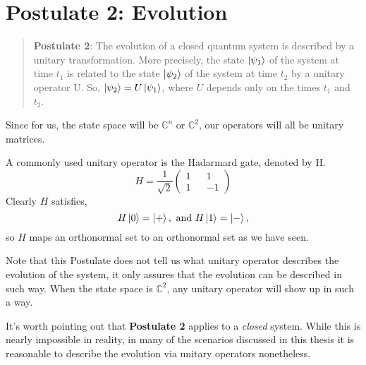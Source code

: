 \section{Postulate 2: Evolution}

\begin{quote}
    \textbf{Postulate 2}: The evolution of a closed quantum system is described by a unitary transformation. More precisely, the state $\ket{\psi_1}$ of the system at time $t_1$ is related to the state $\ket{\psi_2}$ of the system at time $t_2$ by a unitary operator U.  So, $\ket{\psi_2}=U\ket{\psi_1}$, where $U$ depends only on the times $t_1$ and $t_2$.
\end{quote}

Since for us, the state space will be ${\mathbb{C}}^n$ or ${\mathbb{C}}^2$, our operators will all be unitary matrices.  

\begin{example} 
A commonly used unitary operator is the Hadarmard gate, denoted by H.  
\begin{equation}
   H=\frac{1}{\sqrt{2}}\begin{pmatrix}
1 && 1\\
1 && -1
\end{pmatrix} 
\end{equation}
Clearly $H$ satisfies,
$$H\ket{0}=\ket{+}, \textrm{ and }H\ket{1}=\ket{-},$$
so $H$ maps an orthonormal set to an orthonormal set as we have seen.

\end{example}


Note that this Postulate does not tell us what unitary operator describes the evolution of the system, it only assures that the evolution can be described in such way.  When the state space is ${\mathbb{C}}^2$, any unitary operator will show up in such a way.

It's worth pointing out that {\bf{Postulate 2}} applies to a \emph{closed} system.  While this is nearly impossible in reality, in many of the scenarios discussed in this thesis it is reasonable to describe the evolution via unitary operators nonetheless.





\pagebreak
